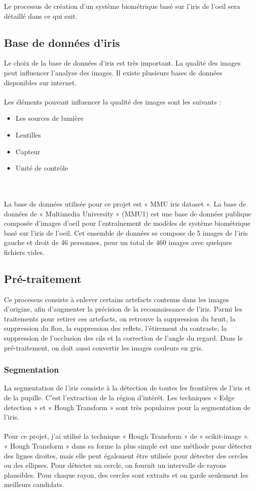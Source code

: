 \documentclass[12pt,twoside,letterpaper]{article}
\begin{document}
Le processus de création d'un système biométrique basé sur l'iris de l'oeil sera détaillé dans ce qui suit.

\subsection{Base de données d’iris}
Le choix de la base de données d’iris est très important. La qualité des images peut influencer l’analyse des images. Il existe plusieurs bases de données disponibles sur internet.
\\~\\
Les éléments pouvant influencer la qualité des images sont les suivants :
\begin{itemize}
    \item Les sources de lumière
    \item Lentilles
    \item Capteur
    \item Unité de contrôle
\end{itemize}
\cite{ref_01}\cite{ref_06}
\ \\~\\
La base de données utilisée pour ce projet est « MMU iris dataset ». La base de données de « Multimedia University » (MMU1) est une base de données publique composée d'images d'oeil pour l'entraînement de modèles de système biométrique basé sur l'iris de l'oeil. Cet ensemble de données se compose de 5 images de l'iris gauche et droit de 46 personnes, pour un total de 460 images avec quelques fichiers vides.\cite{ref_05}

\subsection{Pré-traitement}
Ce processus consiste à enlever certains artefacts contenus dans les images d’origine, afin d’augmenter la précision de la reconnaissance de l’iris. Parmi les traitements pour retirer ces artefacts, on retrouve la suppression du bruit, la suppression du flou, la suppression des reflets, l’étirement du contraste, la suppression de l’occlusion des cils et la correction de l'angle du regard. Dans le pré-traitement, on doit aussi convertir les images couleurs en gris.\cite{ref_01}\cite{ref_06}


\subsubsection{Segmentation}
La segmentation de l’iris consiste à la détection de toutes les frontières de l’iris et de la pupille. C’est l’extraction de la région d’intérêt. Les techniques « Edge detection » et « Hough Transform » sont très populaires pour la segmentation de l’iris. 
\\~\\
Pour ce projet, j'ai utilisé la technique « Hough Transform » de « scikit-image ». « Hough Transform » dans sa forme la plus simple est une méthode pour détecter des lignes droites, mais elle peut également être utilisée pour détecter des cercles ou des ellipses. Pour détecter un cercle, on fournit un intervalle de rayons plausibles. Pour chaque rayon, des cercles sont extraits et on garde seulement les meilleurs candidats.\cite{ref_04}
\end{document}
